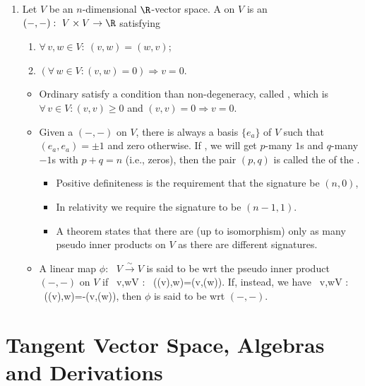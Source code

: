\documentclass{article}
\newcommand{\cl}{:\text{ }}
\begin{document}
\begin{enumerate}
\item {} Let $V$ be an $n$-dimensional $\R$-vector space. A  on $V$ is an  $(-,-)\cl V\times V \to \R$ satisfying
\begin{enumerate}
    \item {} $\forall \, v,w\in V : \ (v,w)=(w,v)$;
    \item {} $(\forall \, w\in V : (v,w)=0)\Rightarrow v = 0$.
\end{enumerate}
\begin{itemize}
    \item Ordinary  satisfy a  condition than non-degeneracy, called , which is $\forall \, v \in V : (v,v)\geq 0$ and $(v,v)=0 \Rightarrow v=0$.
    \item {} Given a  $(-,-)$ on $V$, there is always a basis $\{e_a\}$ of $V$ such that $(e_a,e_a)=\pm 1$ and zero otherwise. If , we will get $p$-many $1$s and $q$-many $-1$s with $p+q=n$ (i.e.,  zeros), then the pair $(p,q)$ is called the  of the . 
    \begin{itemize}[$\ast$]
        \item Positive definiteness is the requirement that the signature be $(n,0)$, 
        \item In relativity we require the signature to be $(n-1,1)$.
        \item A theorem states that there are (up to isomorphism) only as many pseudo inner products on $V$ as there are different signatures.
    \end{itemize}
    \item  {} 
A linear map $\phi\cl V\xrightarrow{\sim}V$ is said to be  \gls{wrt} the pseudo inner product $(-,-)$ on $V$ if
\bse
\forall \, v,w\in V : \ (\phi(v),w)=(v,\phi(w)).
\ese
If, instead, we have
\bse
\forall \, v,w\in V : \ (\phi(v),w)=-(v,\phi(w)),
\ese
then $\phi$ is said to be  \gls{wrt} $(-,-)$.
\end{itemize} 

\end{enumerate}

\section{Tangent Vector Space, Algebras and Derivations}\label{sec:tangent}
\end{document}
